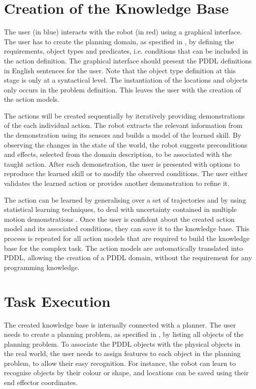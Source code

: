 \section{Creation of the Knowledge Base}
The user (in blue) interacts with the robot (in red) using a graphical interface. The user has to create the planning domain, as specified in , by defining the requirements, object types and predicates, i.e. conditions that can be included in the action definition. The graphical interface should present the PDDL definitions in English sentences for the user. Note that the object type definition at this stage is only at a syntactical level. The instantiation of the locations and objects only occurs in the problem definition. This leaves the user with the creation of the action models.

The actions will be created sequentially by iteratively providing demonstrations of the each individual action. The robot extracts the relevant information from the demonstration using its sensors and builds a model of the learned skill.
By observing the changes in the state of the world, the robot suggests preconditions and effects, selected from the domain description, to be associated with the taught action. After each demonstration, the user is presented with options to reproduce the learned skill or to modify the observed conditions. The user either validates the learned action or provides another demonstration to refine it. 

The action can be learned by generalising over a set of trajectories and by using statistical learning techniques, to deal with uncertainty contained in multiple motion demonstrations \cite{ude1993trajectory}.
Once the user is confident about the created action model and its associated conditions, they can save it to the knowledge base. This process is repeated for all action models that are required to build the knowledge base for the complex task. The action models are automatically translated into PDDL, allowing the creation of a PDDL domain, without the requirement for any programming knowledge.

\section{Task Execution}
The created knowledge base is internally connected with a planner. The user needs to create a planning problem, as specified in , by listing all objects of the planning problem. To associate the PDDL objects with the physical objects in the real world, the user needs to assign features to each object in the planning problem, to allow their easy recognition. For instance, the robot can learn to recognise objects by their colour or shape, and locations can be saved using their end effector coordinates.

